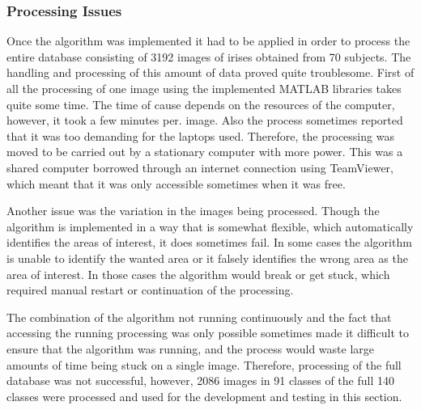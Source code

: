 \subsubsection{Processing Issues}
Once the algorithm was implemented it had to be applied in order to process the entire database consisting of 3192 images of irises obtained from 70 subjects. The handling and processing of this amount of data proved quite troublesome. First of all the processing of one image using the implemented MATLAB libraries takes quite some time. The time of cause depends on the resources of the computer, however, it took a few minutes per. image. Also the process sometimes reported that it was too demanding for the laptops used. Therefore, the processing was moved to be carried out by a stationary computer with more power. This was a shared computer borrowed through an internet connection using TeamViewer, which meant that it was only accessible sometimes when it was free. 

Another issue was the variation in the images being processed. Though the algorithm is implemented in a way that is somewhat flexible, which automatically identifies the areas of interest, it does sometimes fail. In some cases the algorithm is unable to identify the wanted area or it falsely identifies the wrong area as the area of interest. In those cases the algorithm would break or get stuck, which required manual restart or continuation of the processing. 

The combination of the algorithm not running continuously and the fact that accessing the running processing was only possible sometimes made it difficult to ensure that the algorithm was running, and the process would waste large amounts of time being stuck on a single image. Therefore, processing of the full database was not successful, however, 2086 images in 91 classes of the full 140 classes were processed and used for the development and testing in this section. 










